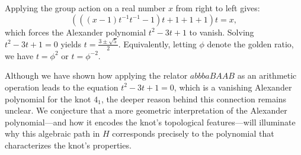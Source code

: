 \documentclass{article}[a4paper,12pt]
\begin{document}
    Applying the group action on a real number $x$ from right to left gives:
    \[
        (((x - 1) t^{-1} t^{-1} - 1) t + 1 + 1 + 1) t = x,
    \]
    which forces the Alexander polynomial $t^2 - 3t + 1$ to vanish.
    Solving $t^2 - 3t + 1 = 0$ yields $t = \frac{3 \pm \sqrt{5}}{2}$.
    Equivalently, letting $\phi$ denote the golden ratio, we have $t = \phi^2$ or $t = \phi^{-2}$.

    Although we have shown how applying the relator $abbbaBAAB$ as an arithmetic operation leads to the equation $t^2 - 3t + 1=0$, which is a vanishing Alexander polynomial for the knot $4_1$, the deeper reason behind this connection remains unclear.
    We conjecture that a more geometric interpretation of the Alexander polynomial---and how it encodes the knot's topological features—will illuminate why this algebraic path in $H$ corresponds precisely to the polynomial that characterizes the knot's properties.
\end{document}

